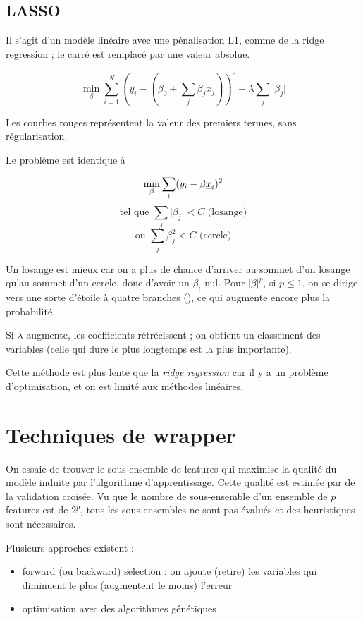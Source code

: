 	\subsection{LASSO}
	
	Il s'agit d'un modèle linéaire avec une pénalisation L1, comme de la ridge regression ; le carré est remplacé par une valeur absolue.
	
	$$\min_{\beta} \sum_{i = 1}^N (y_i -(\beta_0 + \sum_j \beta_j x_j))^2 + \lambda \sum_j \vert \beta_j \vert$$
	
	Les courbes rouges représentent la valeur des premiers termes, sans régularisation.
	
	
	
	Le problème est identique à
	
	$$\min_{\beta} \sum_i (y_i - \beta \underline{x}_i)^2$$
	$$\text{tel que } \sum_j \vert \beta_j \vert < C \text{ (losange)}$$
	$$\text{ou  } \sum_j  \beta_j^2  < C \text{ (cercle)}$$
	
	Un losange est mieux car on a plus de chance d'arriver au sommet d'un losange qu'au sommet d'un cercle, donc d'avoir un $\beta_i$ nul. Pour $\vert \beta \vert^p$, si $p \leq 1$, on se dirige vers une sorte d'étoile à quatre branches (), ce qui augmente encore plus la probabilité.
	
	Si $\lambda$ augmente, les coefficients rétrécissent ; on obtient un classement des variables (celle qui dure le plus longtemps est la plus importante).
	
	Cette méthode est plus lente que la \textit{ridge regression} car il y a un problème d'optimisation, et on est limité aux méthodes linéaires.
	
\section{Techniques de wrapper}

On essaie de trouver le sous-ensemble de features qui maximise la qualité du modèle induite par l'algorithme d'apprentissage. Cette qualité est estimée par de la validation croisée. Vu que le nombre de sous-ensemble d'un ensemble de $p$ features est de $2^p$, tous les sous-ensembles ne sont pas évalués et des heuristiques sont nécessaires.

Plusieurs approches existent :

\begin{itemize}
	\item forward (ou backward) selection : on ajoute (retire) les variables qui diminuent le plus (augmentent le moins) l'erreur
	\item optimisation avec des algorithmes génétiques
\end{itemize}

